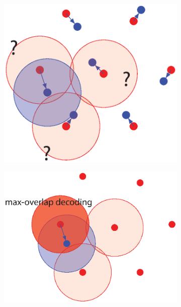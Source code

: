 \begin{figure}[th!]
\begin{subfigure}[b]{.48\textwidth}
      \caption{}
      \label{fig:coding_scheme_cartoon_2}
  \end{subfigure}
  \\[.5cm]
  \begin{subfigure}[b]{.48\textwidth}
      \includegraphics[width=\linewidth]{figures/ch_generic_approach/coding_scheme_3}
      \caption{}
      \label{fig:coding_scheme_cartoon_3}
  \end{subfigure}
  \hfill
  \begin{subfigure}[b]{.48\textwidth}
      \includegraphics[width=\linewidth]{figures/ch_generic_approach/coding_scheme_4}

\end{subfigure}
\end{figure}
